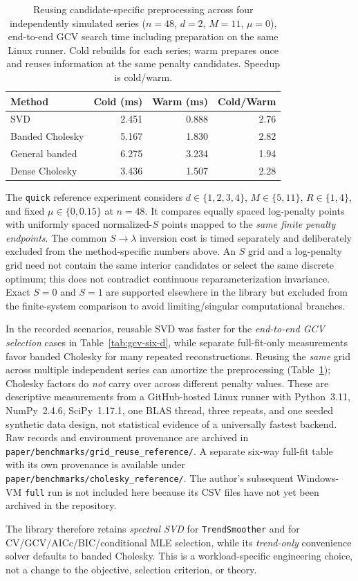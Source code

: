 \begin{table}[tbp]
\centering
\caption{Reusing candidate-specific preprocessing across four independently simulated series ($n=48$, $d=2$, $M=11$, $\mu=0$), end-to-end GCV search time including preparation on the same Linux runner. Cold rebuilds for each series; warm prepares once and reuses information at the same penalty candidates. Speedup is cold/warm.}
\label{tab:gcv-reuse}
\begin{tabular}{lrrr}
\toprule
Method & Cold (ms) & Warm (ms) & Cold/Warm \\
\midrule
SVD & 2.451 & 0.888 & 2.76 \\
Banded Cholesky & 5.167 & 1.830 & 2.82 \\
General banded & 6.275 & 3.234 & 1.94 \\
Dense Cholesky & 3.436 & 1.507 & 2.28 \\
\bottomrule
\end{tabular}
\end{table}


The \texttt{quick} reference experiment considers $d\in\{1,2,3,4\}$,
$M\in\{5,11\}$, $R\in\{1,4\}$, and fixed
$\mu\in\{0,0.15\}$ at $n=48$. It compares equally spaced
log-penalty points with uniformly spaced normalized-$S$ points
mapped to the \emph{same finite penalty endpoints}. The common
$S\to\lambda$ inversion cost is timed separately and deliberately
excluded from the method-specific numbers above. An $S$ grid and
a log-penalty grid need not contain the same interior candidates
or select the same discrete optimum; this does not contradict
continuous reparameterization invariance. Exact $S=0$ and $S=1$
are supported elsewhere in the library but excluded from the
finite-system comparison to avoid limiting/singular computational
branches.

In the recorded scenarios, reusable SVD was faster for the
\emph{end-to-end GCV selection} cases in Table~\ref{tab:gcv-six-d},
while separate full-fit-only measurements favor banded Cholesky
for many repeated reconstructions. Reusing the \emph{same} grid
across multiple independent series can amortize the preprocessing
(Table~\ref{tab:gcv-reuse}); Cholesky factors do \emph{not}
carry over across different penalty values. These are descriptive
measurements from a GitHub-hosted Linux runner with Python~3.11,
NumPy~2.4.6, SciPy~1.17.1, one BLAS thread, three repeats,
and one seeded synthetic data design, not statistical evidence
of a universally fastest backend. Raw records and environment
provenance are archived in
\texttt{paper/benchmarks/grid\_reuse\_reference/}. A separate
six-way full-fit table with its own provenance is available under
\texttt{paper/benchmarks/cholesky\_reference/}. The author's
subsequent Windows-VM \texttt{full} run is not included here
because its CSV files have not yet been archived in the repository.

The library therefore retains \emph{spectral SVD} for
\texttt{TrendSmoother} and for CV/GCV/AICc/BIC/conditional MLE
selection, while its \emph{trend-only} convenience solver defaults
to banded Cholesky. This is a workload-specific engineering choice,
not a change to the objective, selection criterion, or theory.
